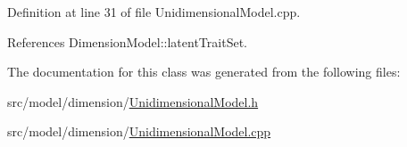 Definition at line 31 of file Unidimensional\+Model.\+cpp.



References Dimension\+Model\+::latent\+Trait\+Set.



The documentation for this class was generated from the following files\+:\begin{DoxyCompactItemize}
\item 
src/model/dimension/\hyperlink{UnidimensionalModel_8h}{Unidimensional\+Model.\+h}\item 
src/model/dimension/\hyperlink{UnidimensionalModel_8cpp}{Unidimensional\+Model.\+cpp}\end{DoxyCompactItemize}
